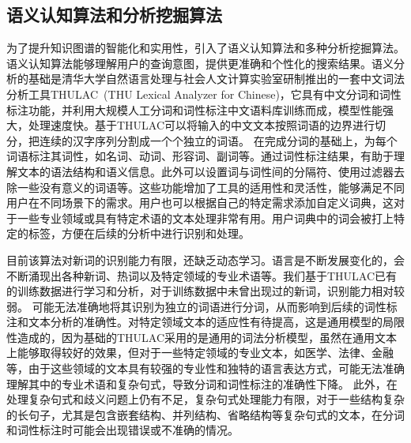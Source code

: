 \subsection{语义认知算法和分析挖掘算法} 
为了提升知识图谱的智能化和实用性，引入了语义认知算法和多种分析挖掘算法。语义认知算法能够理解用户的查询意图，提供更准确和个性化的搜索结果。语义分析的基础是清华大学自然语言处理与社会人文计算实验室研制推出的一套中文词法分析工具\textrm{THULAC~(THU Lexical Analyzer for Chinese)}，它具有中文分词和词性标注功能，并利用大规模人工分词和词性标注中文语料库训练而成，模型性能强大，处理速度快。基于\textrm{THULAC}可以将输入的中文文本按照词语的边界进行切分，把连续的汉字序列分割成一个个独立的词语。%
在完成分词的基础上，为每个词语标注其词性，如名词、动词、形容词、副词等。通过词性标注结果，有助于理解文本的语法结构和语义信息。此外可以设置词与词性间的分隔符、使用过滤器去除一些没有意义的词语等。这些功能增加了工具的适用性和灵活性，能够满足不同用户在不同场景下的需求。用户也可以根据自己的特定需求添加自定义词典，这对于一些专业领域或具有特定术语的文本处理非常有用。用户词典中的词会被打上特定的标签，方便在后续的分析中进行识别和处理。 

目前该算法对新词的识别能力有限，还缺乏动态学习。语言是不断发展变化的，会不断涌现出各种新词、热词以及特定领域的专业术语等。我们基于\textrm{THULAC}已有的训练数据进行学习和分析，对于训练数据中未曾出现过的新词，识别能力相对较弱。%
可能无法准确地将其识别为独立的词语进行分词，从而影响到后续的词性标注和文本分析的准确性。对特定领域文本的适应性有待提高，这是通用模型的局限性造成的，因为基础的\textrm{THULAC}采用的是通用的词法分析模型，虽然在通用文本上能够取得较好的效果，但对于一些特定领域的专业文本，如医学、法律、金融等，由于这些领域的文本具有较强的专业性和独特的语言表达方式，可能无法准确理解其中的专业术语和复杂句式，导致分词和词性标注的准确性下降。%
此外，在处理复杂句式和歧义问题上仍有不足，复杂句式处理能力有限，对于一些结构复杂的长句子，尤其是包含嵌套结构、并列结构、省略结构等复杂句式的文本，在分词和词性标注时可能会出现错误或不准确的情况。%

